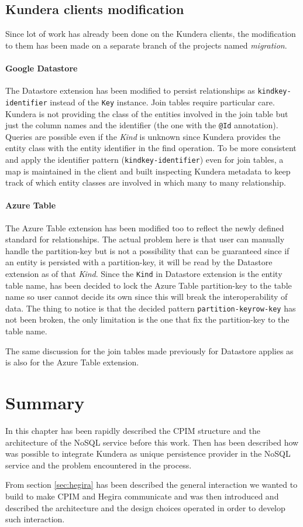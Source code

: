 \subsection{Kundera clients modification}
Since lot of work has already been done on the Kundera clients, the modification to them has been made on a separate branch of the projects named \textit{migration}.

\paragraph{Google Datastore} The Datastore extension has been modified to persist relationships as \texttt{kind\textunderscore key-identifier} instead of the \texttt{Key} instance.
Join tables require particular care. Kundera is not providing the class of the entities involved in the join table but just the column names and the identifier (the one with the \texttt{@Id} annotation). Queries are possible even if the \textit{Kind} is unknown since Kundera provides the entity class with the entity identifier in the find operation.
To be more consistent and apply the identifier pattern (\texttt{kind\textunderscore key-identifier}) even for join tables, a map is maintained in the client and built inspecting Kundera metadata to keep track of which entity classes are involved in which many to many relationship.

\paragraph{Azure Table} The Azure Table extension has been modified too to reflect the newly defined standard for relationships. The actual problem here is that user can manually handle the partition-key but is not a possibility that can be guaranteed since if an entity is persisted with a partition-key, it will be read by the Datastore extension as of that \textit{Kind}.
Since the \texttt{Kind} in Datastore extension is the entity table name, has been decided to lock the Azure Table partition-key to the table name so user cannot decide its own since this will break the interoperability of data.
The thing to notice is that the decided pattern \texttt{partition-key\textunderscore row-key} has not been broken, the only limitation is the one that fix the partition-key to the table name.

\noindent The same discussion for the join tables made previously for Datastore applies as is also for the Azure Table extension.

\section{Summary}
In this chapter has been rapidly described the CPIM structure and the architecture of the NoSQL service before this work. Then has been described how was possible to integrate Kundera as unique persistence provider in the NoSQL service and the problem encountered in the process.

\noindent From section \ref{sec:hegira} has been described the general interaction we wanted to build to make CPIM and Hegira communicate and was then introduced and described the architecture and the design choices operated in order to develop such interaction. 
